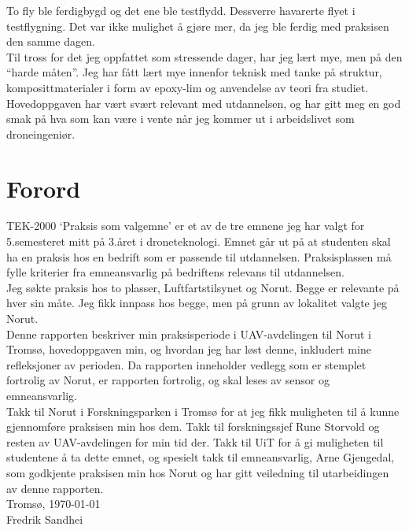 \documentclass[12pt, a4paper]{article}
\begin{document}
To fly ble ferdigbygd og det ene ble testflydd. Dessverre havarerte flyet i testflygning. Det var ikke mulighet å gjøre mer, da jeg ble ferdig med praksisen den samme dagen. \\

Til tross for det jeg oppfattet som stressende dager, har jeg lært mye, men på den ``harde måten''. Jeg har fått lært mye innenfor teknisk med tanke på struktur, komposittmaterialer i form av epoxy-lim og anvendelse av teori fra studiet. Hovedoppgaven har vært svært relevant med utdannelsen, og har gitt meg en god smak på hva som kan være i vente når jeg kommer ut i arbeidslivet som droneingeniør. \\

\clearpage
\section*{Forord}
TEK-2000 `Praksis som valgemne' er et av de tre emnene jeg har valgt for 5.semesteret mitt på 3.året i droneteknologi. Emnet går ut på at studenten skal ha en praksis hos en bedrift som er passende til utdannelsen. Praksisplassen må fylle kriterier fra emneansvarlig på bedriftens relevans til utdannelsen. \\

Jeg søkte praksis hos to plasser, Luftfartstilsynet og Norut. Begge er relevante på hver sin måte. Jeg fikk innpass hos begge, men på grunn av lokalitet valgte jeg Norut.\\

Denne rapporten beskriver min praksisperiode i UAV-avdelingen til Norut i Tromsø, hovedoppgaven min, og hvordan jeg har løst denne, inkludert mine refleksjoner av perioden. Da rapporten inneholder vedlegg som er stemplet fortrolig av Norut, er rapporten fortrolig, og skal leses av sensor og emneansvarlig. \\ 

Takk til Norut i Forskningsparken i Tromsø for at jeg fikk muligheten til å kunne gjennomføre praksisen min hos dem. Takk til forskningssjef Rune Storvold og resten av UAV-avdelingen for min tid der. Takk til UiT for å gi muligheten til studentene å ta dette emnet, og spesielt takk til emneansvarlig, Arne Gjengedal, som godkjente praksisen min hos Norut og har gitt veiledning til utarbeidingen av denne rapporten. \\[7cm]
Tromsø, \today \\[.5cm]

Fredrik Sandhei\\
\end{document}
